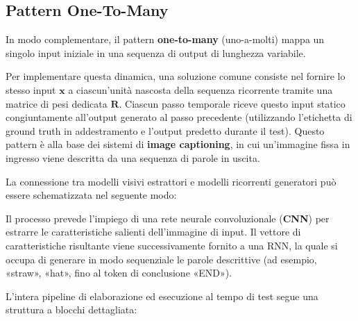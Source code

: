 ﻿\documentclass[11pt, a4paper]{article}
\begin{document}
\subsection{Pattern One-To-Many}

In modo complementare, il pattern \textbf{one-to-many} (uno-a-molti) mappa un singolo input iniziale in una sequenza di output di lunghezza variabile.


Per implementare questa dinamica, una soluzione comune consiste nel fornire lo stesso input $\bm{x}$ a ciascun'unità nascosta della sequenza ricorrente tramite una matrice di pesi dedicata $\bm{R}$. Ciascun passo temporale riceve questo input statico congiuntamente all'output generato al passo precedente (utilizzando l'etichetta di ground truth in addestramento e l'output predetto durante il test). Questo pattern è alla base dei sistemi di \textbf{image captioning}, in cui un'immagine fissa in ingresso viene descritta da una sequenza di parole in uscita.

La connessione tra modelli visivi estrattori e modelli ricorrenti generatori può essere schematizzata nel seguente modo:


Il processo prevede l'impiego di una rete neurale convoluzionale (\textbf{CNN}) per estrarre le caratteristiche salienti dell'immagine di input. Il vettore di caratteristiche risultante viene successivamente fornito a una RNN, la quale si occupa di generare in modo sequenziale le parole descrittive (ad esempio, «straw», «hat», fino al token di conclusione «END»).

L'intera pipeline di elaborazione ed esecuzione al tempo di test segue una struttura a blocchi dettagliata:

\end{document}
